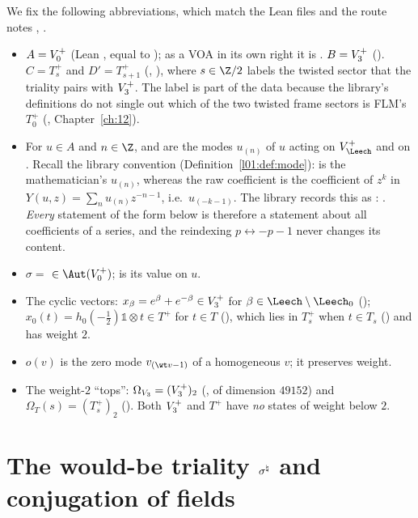 We fix the following abbreviations, which match the Lean files and the route notes
, .
\begin{itemize}
\item $A=V_0^{+}$ (Lean , equal to ); as a VOA in its own
  right it is .  $B=V_3^{+}$ ().  $C=T_s^+$ and $D'=T_{s+1}^+$
  (, ), where $s\in\Z/2$ labels the twisted sector that the
  triality pairs with $V_3^{+}$.  The label is part of the data because the library's definitions do
  not single out which of the two twisted frame sectors is FLM's $T_0^+$
  (, Chapter~\ref{ch:12}).
\item For $u\in A$ and $n\in\Z$,  and  are the modes $u_{(n)}$ of $u$
  acting on $V_\Leech^+$ and on .  Recall the library convention
   (Definition~\ref{l01:def:mode}):  is the mathematician's
  $u_{(n)}$, whereas the raw coefficient  is the coefficient of $z^{k}$ in
  $Y(u,z)=\sum_n u_{(n)}z^{-n-1}$, i.e.\ $u_{(-k-1)}$.  The library records this as
  : .  \emph{Every} statement of the
  form  below is therefore a statement about all coefficients of a series, and
  the reindexing $p\leftrightarrow -p-1$ never changes its content.
\item $\sigma=$  $\in\Aut(\chXIVA)$;  is its value on $u$.
\item The cyclic vectors: $x_\beta=e^\beta+e^{-\beta}\in V_3^{+}$ for $\beta\in\Leech\setminus\Leech_0$
  (); $x_0(t)=h_0(-\tfrac12)\mathbb 1\otimes t\in T^+$ for $t\in T$
  (), which lies in $T_s^+$ when $t\in T_s$ () and has weight $2$.
\item $o(v)$ is the zero mode $v_{(\wt v-1)}$ of a homogeneous $v$; it preserves weight.
\item The weight-$2$ ``tops'': $\Omega_{V_3}=(V_3^{+})_2$ (, of dimension $49152$) and
  $\Omega_T(s)=(T_s^+)_2$ ().  Both $V_3^{+}$ and $T^+$ have \emph{no} states of weight
  below $2$.
\end{itemize}

\section{\texorpdfstring{The would-be triality $\sigma^{\natural}$ and conjugation of fields}{The would-be triality sigma-natural and conjugation of fields}}\label{ch14:sec:conj}

